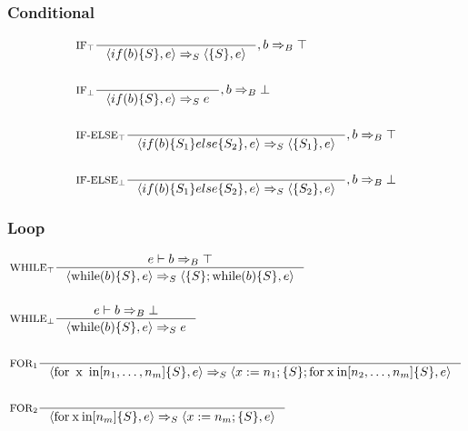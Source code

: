 \subsubsection{Conditional}
\newcommand{\Tif}{\text{if}}
\newcommand{\Telse}{\text{else}}

\begin{align*}
&\inference[$\text{IF}_\top$]{}
                      {\Braket{if(b)\{S\},e} \Rightarrow_S \Braket{\{S\},e}}
											{,b \Rightarrow_B \top}
\\\\
&\inference[$\text{IF}_\bot$]{}
                      {\Braket{if(b)\{S\},e} \Rightarrow_S e}
											{,b \Rightarrow_B \bot}
\\\\
&\inference[$\text{IF-ELSE}_\top$]{}
                      {\Braket{if(b)\{S_1\}else\{S_2\},e} \Rightarrow_S \Braket{\{S_1\},e}}
											{,b \Rightarrow_B \top}
\\\\
&\inference[$\text{IF-ELSE}_\bot$]{}
                      {\Braket{if(b)\{S_1\}else\{S_2\},e} \Rightarrow_S \Braket{\{S_2\},e}}
											{,b \Rightarrow_B \bot}
\end{align*}
\subsubsection{Loop}
\newcommand{\Tfor}{\mathbin{\text{for}}}
\newcommand{\Tin}{\mathbin{\text{in}}}
\newcommand{\Twhile}{\mathbin{\text{while}}}

\begin{align*}
&\inference[$\text{WHILE}_\top$]{e \vdash b \Rightarrow_B \top}
                       {\Braket{\Twhile(b)\{S\},e} \Rightarrow_S \Braket{\{S\}; \Twhile (b)\{S\},e}}
\\\\
&\inference[$\text{WHILE}_\bot$]{e \vdash b \Rightarrow_B \bot}
                       {\Braket{\Twhile(b)\{S\},e} \Rightarrow_S e}
\\\\
&\inference[$\text{FOR}_{1}$]{}
                       {\Braket{\Tfor \Tx \Tin [n_1,\dots,n_m]\{S\},e} \Rightarrow_S \Braket{x := n_1;\{S\}; \Tfor \mathbin{\text{x}} \mathbin{\text{in}} [n_2,\dots,n_m]\{S\},e}}
\\\\
&\inference[$\text{FOR}_{2}$]{}
                       {\Braket{\Tfor \mathbin{\text{x}} \mathbin{\text{in}} [n_m]\{S\},e} \Rightarrow_S \Braket{x := n_m;\{S\},e}}
\end{align*}

